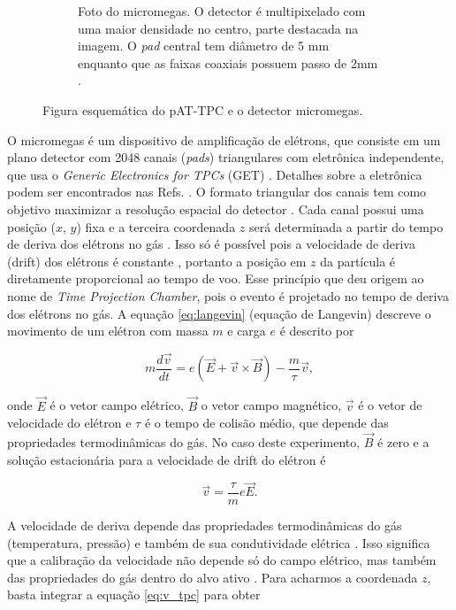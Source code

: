 \documentclass[a4paper,12pt,oneside]{book}
\begin{document}
\begin{figure}[H]
\begin{subfigure}[t]{0.49\textwidth}
        \caption{Foto do micromegas. O detector é multipixelado com uma maior densidade no centro, parte destacada na imagem. O \textit{pad} central tem diâmetro de 5 mm enquanto que as faixas coaxiais possuem passo de 2mm \cite{attpc, josh_bradt}.}
        \label{subfig:micromegas} 
    \end{subfigure}
\caption{Figura esquemática do pAT-TPC e o detector micromegas\cite{pattpc}.}
\label{fig:pattpc_e_micromegas}
\end{figure}

\par O micromegas é um dispositivo de amplificação de elétrons, que consiste em um plano detector com 2048 canais (\textit{pads}) triangulares com eletrônica independente, que usa o \textit{Generic Electronics for TPCs} (GET) \cite{GET}. Detalhes sobre a eletrônica podem ser encontrados nas Refs. \cite{GET, josh_bradt}. O formato triangular dos canais tem como objetivo maximizar a resolução espacial do detector \cite{attpc}. Cada canal possui uma posição ($x$, $y$) fixa e a terceira coordenada $z$ será determinada a partir do tempo de deriva dos elétrons no gás \cite{pattpc, pattpc2, attpc, josh_bradt}. Isso só é possível pois a velocidade de deriva (drift) dos elétrons é constante \cite{drift_constant}, portanto a posição em $z$ da partícula é diretamente proporcional ao tempo de voo. Esse princípio que deu origem ao nome de \textit{Time Projection Chamber}, pois o evento é projetado no tempo de deriva dos elétrons no gás. A equação  \ref{eq:langevin} (equação de Langevin) descreve o movimento de um elétron com massa $m$ e carga $e$ é descrito por \cite{drift_constant}

\begin{equation}\label{eq:langevin}
    m\frac{d\vec{v}}{dt} = e\left(\vec{E} +\vec{v}\times \vec{B}\right) - \frac{m}{\tau}\vec{v},
\end{equation}

onde $\vec{E}$ é o vetor campo elétrico, $\vec{B}$ o vetor campo magnético, $\vec{v}$ é o vetor de velocidade do elétron e $\tau$ é o tempo de colisão médio, que depende das propriedades termodinâmicas do gás. No caso deste experimento, $\vec{B}$ é zero e a solução estacionária para a velocidade de drift do elétron é

\begin{equation}\label{eq:v_tpc}
    \vec{v} = \frac{\tau}{m}e\vec{E}.
\end{equation}

\par A velocidade de deriva depende das propriedades termodinâmicas do gás (temperatura, pressão) e também de sua condutividade elétrica \cite{drift_constant}. Isso significa que a calibração da velocidade não depende só do campo elétrico, mas também das propriedades do gás dentro do alvo ativo \cite{pattpc, drift_constant}. Para acharmos a coordenada $z$, basta integrar a equação \ref{eq:v_tpc} para obter
\end{document}
